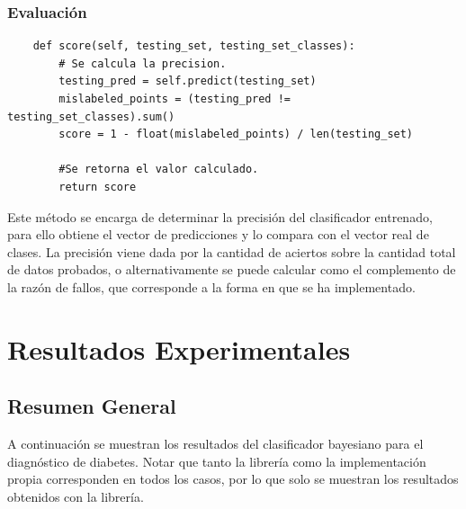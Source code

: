 \documentclass[letter, titlepage, 10pt]{article}
\begin{document}
\newpage

\subsubsection{Evaluación}
\begin{lstlisting}
    def score(self, testing_set, testing_set_classes):
        # Se calcula la precision.
        testing_pred = self.predict(testing_set)
        mislabeled_points = (testing_pred != testing_set_classes).sum()
        score = 1 - float(mislabeled_points) / len(testing_set)

        #Se retorna el valor calculado.
        return score

\end{lstlisting}

Este método se encarga de determinar la precisión del clasificador entrenado, para ello obtiene el vector de predicciones y lo compara con el vector real de clases. La precisión viene dada por la cantidad de aciertos sobre la cantidad total de datos probados, o alternativamente se puede calcular como el complemento de la razón de fallos, que corresponde a la forma en que se ha implementado.\\


\section{Resultados Experimentales}
\subsection{Resumen General}
A continuación se muestran los resultados del clasificador bayesiano para el diagnóstico de diabetes. Notar que tanto la librería como la implementación propia corresponden en todos los casos, por lo que solo se muestran los resultados obtenidos con la librería.
\end{document}
